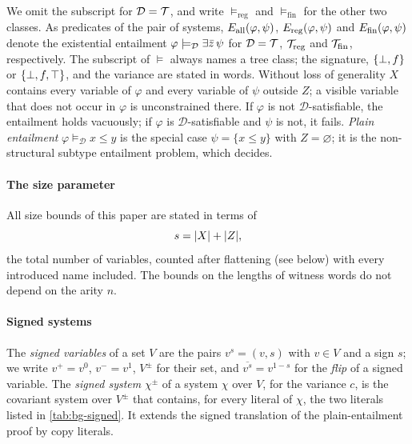 We omit the subscript for $\mathcal D=\mathcal{T}$, and write $\models_{\mathrm{reg}}$
and $\models_{\mathrm{fin}}$ for the other two classes. As predicates of the
pair of systems, $E_{\mathrm{all}}(\varphi,\psi)$, $E_{\mathrm{reg}}(\varphi,\psi)$ and
$E_{\mathrm{fin}}(\varphi,\psi)$ denote the existential entailment
$\varphi\models_{\mathcal D}\exists\bar z\,\psi$ for $\mathcal D=\mathcal{T}$,
$\mathcal{T}_{\mathrm{reg}}$ and $\mathcal{T}_{\mathrm{fin}}$, respectively. The
subscript of $\models$ always names a tree class; the signature, $\{\bot,f\}$ or $\{\bot,f,\top\}$, and the
variance are stated in words. Without loss of generality $X$ contains every
variable of $\varphi$ and every variable of $\psi$ outside $Z$; a visible
variable that does not occur in $\varphi$ is unconstrained there. If $\varphi$
is not $\mathcal D$-satisfiable, the entailment holds vacuously; if $\varphi$
is $\mathcal D$-satisfiable and $\psi$ is not, it fails. \emph{Plain
entailment} $\varphi\models_{\mathcal D}x\le y$ is the special case
$\psi=\{x\le y\}$ with $Z=\varnothing$; it is the non-structural subtype
entailment problem, which \citet{Zhao26} decides.

\paragraph{The size parameter}
All size bounds of this paper are stated in terms of
\[
 s=\lvert X\rvert+\lvert Z\rvert,
\]
the total number of variables, counted after flattening (see below) with every
introduced name included. The bounds on the lengths of witness words do not
depend on the arity $n$.

\paragraph{Signed systems}
The \emph{signed variables} of a set $V$ are the pairs $v^s=(v,s)$ with $v\in V$
and a sign $s$; we write $v^+=v^0$, $v^-=v^1$, $V^\pm$ for their set, and
$\overline{v^s}=v^{1-s}$ for the \emph{flip} of a signed variable. The
\emph{signed system} $\chi^\pm$ of a system $\chi$ over $V$, for the variance
$c$, is the covariant system over $V^\pm$ that contains, for every literal of
$\chi$, the two literals listed in \cref{tab:bg-signed}. It extends the signed
translation of the plain-entailment proof 
by copy literals.

